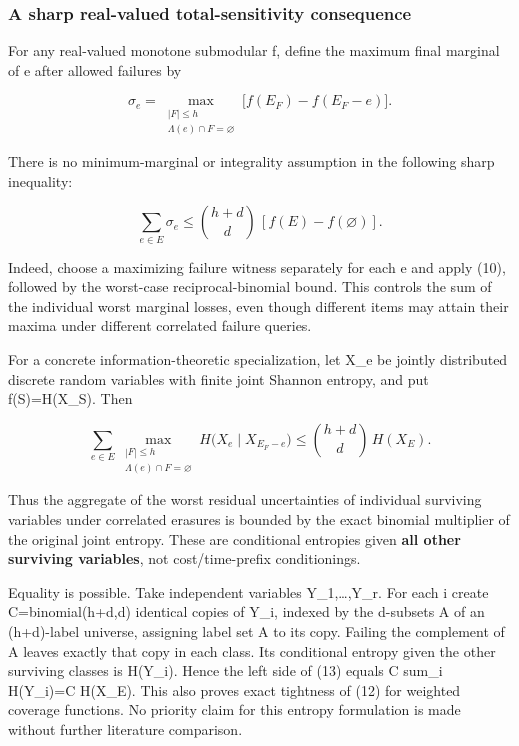 \hypertarget{af-4c0863a692-a-sharp-real-valued-total-sensitivity-consequence}{%
\subsubsection{A sharp real-valued total-sensitivity consequence}\label{af-4c0863a692-a-sharp-real-valued-total-sensitivity-consequence}}

For any real-valued monotone submodular f, define the maximum final marginal of e after allowed failures by

\[
\sigma_e=\max_{\substack{|F|\le h\\\Lambda(e)\cap F=\varnothing}}
\bigl[f(E_F)-f(E_F-e)\bigr].
\]

There is no minimum-marginal or integrality assumption in the following sharp inequality:

\[
\boxed{\sum_{e\in E}\sigma_e\le
\binom{h+d}{d}\,[f(E)-f(\varnothing)].} \tag{12}
\]

Indeed, choose a maximizing failure witness separately for each e and apply (10), followed by the worst-case reciprocal-binomial bound. This controls the sum of the individual worst marginal losses, even though different items may attain their maxima under different correlated failure queries.

For a concrete information-theoretic specialization, let X\_e be jointly distributed discrete random variables with finite joint Shannon entropy, and put f(S)=H(X\_S). Then

\[
\boxed{
\sum_{e\in E}
\max_{\substack{|F|\le h\\\Lambda(e)\cap F=\varnothing}}
H\bigl(X_e\mid X_{E_F-e}\bigr)
\le\binom{h+d}{d}\,H(X_E).
} \tag{13}
\]

Thus the aggregate of the worst residual uncertainties of individual surviving variables under correlated erasures is bounded by the exact binomial multiplier of the original joint entropy. These are conditional entropies given \textbf{all other surviving variables}, not cost/time-prefix conditionings.

Equality is possible. Take independent variables Y\_1,\ldots,Y\_r. For each i create C=binomial(h+d,d) identical copies of Y\_i, indexed by the d-subsets A of an (h+d)-label universe, assigning label set A to its copy. Failing the complement of A leaves exactly that copy in each class. Its conditional entropy given the other surviving classes is H(Y\_i). Hence the left side of (13) equals C sum\_i H(Y\_i)=C H(X\_E). This also proves exact tightness of (12) for weighted coverage functions. No priority claim for this entropy formulation is made without further literature comparison.

